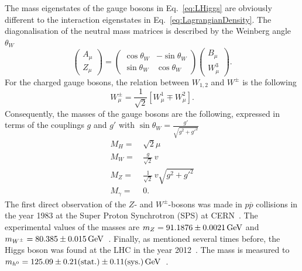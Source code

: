 The mass eigenstates of the gauge bosons in Eq.~\eqref{eq:LHiggs} are obviously different to the interaction eigenstates in Eq.~\eqref{eq:LagrangianDensity}.
The diagonalisation of the neutral mass matrices is described by the Weinberg angle $\theta_W$
\begin{equation}
 \begin{pmatrix} A_{\mu} \\ Z_{\mu} \end{pmatrix} = 
   \begin{pmatrix} \cos \theta_W & - \sin \theta_W \\ \sin \theta_W  & \cos \theta_W \end{pmatrix} \begin{pmatrix} B_{\mu} \\ W^3_{\mu} \end{pmatrix}.
\end{equation}
For the charged gauge bosons, the relation between $W_{1,2}$ and $W^{\pm}$ is the following
\begin{equation}
 W_{\mu}^{\pm}= \frac{1}{\sqrt{2}} \left[ W_{\mu}^1 \mp W_{\mu}^2  \right].
\end{equation}
Consequently, the masses of the gauge bosons are the following, expressed in terms of the couplings $g$ and $g'$ with $\sin{\theta_W} = \frac{g'}{\sqrt{g^2 + g'^2}}$
\begin{equation}
 \begin{split}
  M_H =\,&  \sqrt{2} \mu\\
  M_W =\,& \frac{g}{\sqrt{2}}\, v\\
  M_Z =\,& \frac{1}{\sqrt{2}}\, v \sqrt{g^2 + g'^2}\\
  M_{\gamma} =\,& 0.
 \end{split}
\end{equation}
The first direct observation of the $Z$- and $W^{\pm}$-bosons was made in $p\overline{p}$ collisions in the year 1983 at the Super Proton Synchrotron (SPS) at CERN~\cite{bib:W_discovery,bib:Z_discovery}.
The experimental values of the masses are $m_{Z}=91.1876\pm0.0021\,\text{Ge}\kern-0.06667em\text{V}$ and $m_{W^{\pm}}=80.385\pm0.015\,\text{Ge}\kern-0.06667em\text{V}$~\cite{bib:PDG_2014}.
Finally, as mentioned several times before, the Higgs boson was found at the LHC in the year 2012~\cite{bib:Theory:CMS:HiggsObservation,bib:Theory:Atlas:HiggsObservation}.
The mass is measured to $m_{h^0}=125.09 \pm 0.21\text{(stat.)} \pm 0.11\text{(sys.)}\,\text{Ge}\kern-0.06667em\text{V}$~\cite{bib:HiggsMass}.


